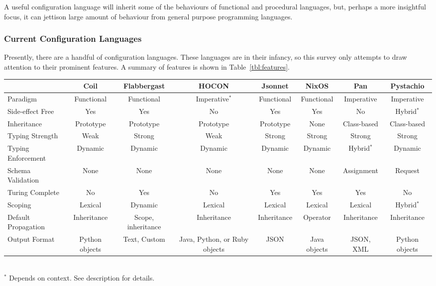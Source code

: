 \documentclass[letterpaper,twocolumn,10pt]{article}
\begin{document}
A useful configuration language will inherit some of the behaviours of functional and procedural languages, but, perhaps a more insightful focus, it can jettison large amount of behaviour from general purpose programming languages.

\subsubsection{Current Configuration Languages}
Presently, there are a handful of configuration languages. These languages are in their infancy, so this survey only attempts to draw attention to their prominent features. A summary of features is shown in Table~\ref{tbl:features}.

\begin{table*}
\caption{\label{tbl:features}Comparison of configuration languages}
\scriptsize
\begin{tabular}{lccccccc}
\hline
										& Coil						& Flabbergast					& HOCON					& Jsonnet			& NixOS				& Pan & Pystachio \\\hline
Paradigm						& Functional			& Functional					& Imperative$^*$&	Functional	& Functional	& Imperative			& Imperative \\
Side-effect Free		& Yes							& Yes									& No						&	Yes					& Yes					& No							& Hybrid$^*$ \\
Inheritance					& Prototype				& Prototype						& Prototype			&	Prototype		& None				& Class-based			& Class-based \\
Typing Strength			& Weak						& Strong							& Weak					&	Strong			& Strong			& Strong					& Strong \\
Typing Enforcement	& Dynamic					& Dynamic							&	Dynamic				&	Dynamic			& Dynamic			& Hybrid$^*$			& Dynamic \\
Schema Validation		& None						& None								& None					& None				& None				& Assignment			& Request \\
Turing Complete			& No							& Yes									& No						& Yes					& Yes					& Yes							& No \\
Scoping							& Lexical					& Dynamic							& Lexical				& Lexical			& Lexical			& Lexical					& Hybrid$^*$ \\
Default Propagation	& Inheritance			&	Scope, inheritance	& Inheritance		& Inheritance	& Operator		& Inheritance			& Inheritance \\
Output Format				& Python objects	&	Text, Custom				& Java, Python, or Ruby objects		& JSON				& Java objects			& JSON, XML				& Python objects \\
\hline
\end{tabular}\\
$^*$ Depends on context. See description for details.
\end{table*}
\end{document}
